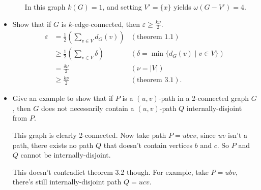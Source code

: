 \documentclass[11pt]{article}
\newcommand\itm[1]{\item[\textbf{#1}]}
\newcommand{\n}{\vspace{0.3cm}}
\begin{document}
\begin{itemize}
\begin{enumerate}[label=(\alph*)]
\begin{center}
      \end{center}

      In this graph \(k(G) = 1\), and setting \(V' = \{x\}\) yields \(\omega(G - V') = 4\).
  \end{enumerate} \n



  \itm{3.1.2} Show that if \(G\) is \(k\)-edge-connected, then \(\varepsilon \geq \displaystyle\frac{k \nu}{2}\). \n
    \begin{align*}
      \varepsilon &= \frac12 \left(\sum_{v \in V} d_G(v)\right) & (\text{theorem 1.1}) \\
                  &\geq \frac12 \left(\sum_{v \in V} \delta \right) & \left(\delta = \min \{d_G(v) \mid v \in V\}\right) \\
                  &= \frac{\delta \nu}{2} & (\nu = |V|) \\
                  &\geq \frac{k \nu}{2} & (\text{theorem 3.1}).
    \end{align*} \n
  



  \itm{3.2.2} Give an example to show that if \(P\) is a \((u,v)\)-path in a 2-connected graph \(G\), then \(G\) does not necessarily contain a \((u,v)\)-path \(Q\) internally-disjoint from \(P\).

      \begin{center}
      \end{center}
      This graph is clearly 2-connected.  Now take path \(P = ubcv\), since \(uv\) isn't a path, there exists no path \(Q\) that doesn't contain vertices \(b\) and \(c\).  So \(P\) and \(Q\) cannot be internally-disjoint. \n

      This doesn't contradict theorem 3.2 though.  For example, take \(P = ubv\), there's still internally-disjoint path \(Q = ucv\).

\end{itemize}
\end{document}
